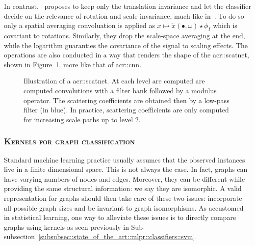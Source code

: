                     In contrast,~\textcite{oyallon2015deep} proposes to keep only the translation invariance and let the classifier decide on the relevance of rotation and scale invariance, much like in~\parencite{cohen2016group}.
                    To do so only a spatial averaging convoluation is applied as $x \mapsto \tilde{x}(\bullet, \omega) \star \phi_I$ which is covariant to rotations.
                    Similarly, they drop the scale-space averaging at the end, while the logarithm guaranties the covariance of the signal to scaling effects.
                    The operations are also conducted in a way that renders the shape of the \gls{acr::scatnet}, shown in Figure~\ref{fig::scatnet}, more like that of \gls{acr::cnn}.

                    \begin{figure}
                        \centering
                        
                        \caption[
                            Illustration of a \acrshort*{acr::scatnet}.
                        ]{
                            \label{fig::scatnet} Illustration of a \gls{acr::scatnet}.
                            At each level are computed are computed convolutions with a filter bank followed by a modulus operator.
                            The scattering coefficients are obtained then by a low-pass filter (in blue).
                            In practice, scattering coefficients are only computed for increasing scale paths up to level $2$.
                        }
                    \end{figure}

        \subsubsection{\textsc{Kernels for graph classification}}
            \label{subsubsec::state_of_the_art::mlpr::feature_extraction::graph_classification}
            Standard machine learning practice usually assumes that the observed instances live in a finite dimensional space.
            This is not always the case.
            In fact, graphs can have varying numbers of nodes and edges.
            Moreover, they can be different while providing the same structural information: we say they are isomorphic.
            A valid representation for graphs should then take care of these two issues: incorporate all possible graph sizes and be invariant to graph isomorphisms.
            As accustomed in statistical learning, one way to alleviate these issues is to directly compare graphs using kernels as seen previously in Sub-subsection~\ref{subsubsec::state_of_the_art::mlpr::classifiers::svm}.\\
            
